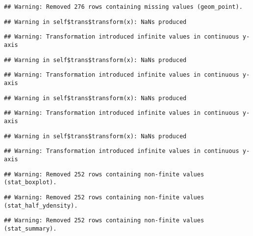 \documentclass[a4paper,nobind]{templates/ociamthesis}
\begin{document}
\begin{landscape}
\begin{verbatim}
## Warning: Removed 276 rows containing missing values (geom_point).
\end{verbatim}

\begin{verbatim}
## Warning in self$trans$transform(x): NaNs produced
\end{verbatim}

\begin{verbatim}
## Warning: Transformation introduced infinite values in continuous y-axis
\end{verbatim}

\begin{verbatim}
## Warning in self$trans$transform(x): NaNs produced
\end{verbatim}

\begin{verbatim}
## Warning: Transformation introduced infinite values in continuous y-axis
\end{verbatim}

\begin{verbatim}
## Warning in self$trans$transform(x): NaNs produced
\end{verbatim}

\begin{verbatim}
## Warning: Transformation introduced infinite values in continuous y-axis
\end{verbatim}

\begin{verbatim}
## Warning in self$trans$transform(x): NaNs produced
\end{verbatim}

\begin{verbatim}
## Warning: Transformation introduced infinite values in continuous y-axis
\end{verbatim}

\begin{verbatim}
## Warning: Removed 252 rows containing non-finite values (stat_boxplot).
\end{verbatim}

\begin{verbatim}
## Warning: Removed 252 rows containing non-finite values (stat_half_ydensity).
\end{verbatim}

\begin{verbatim}
## Warning: Removed 252 rows containing non-finite values (stat_summary).
\end{verbatim}


\end{landscape}
\end{document}
